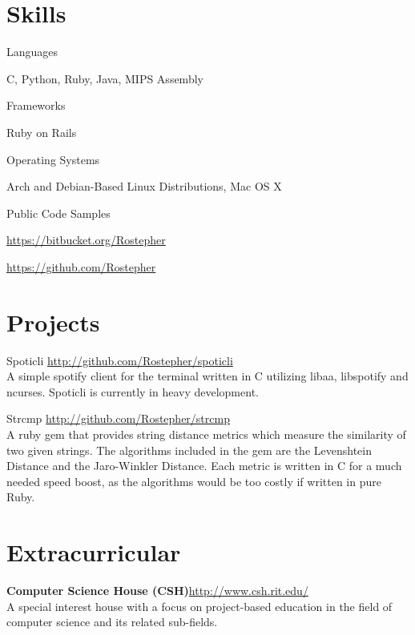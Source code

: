 \documentclass[letterpaper,margin,line,11pt]{resume}
\newcommand{\rurl}[1]{\hfill {\footnotesize \url{#1}}}
\newcommand{\tab}[1]{\hspace{1em}}
\begin{document}
\begin{resume}
\section{\mysidestyle Skills}
	\begin{compactdesc}
		\item[Languages]
			\item\tab{} C, Python, Ruby, Java, MIPS Assembly
			\vspace{1em}
		\item[Frameworks]
			\item\tab{} Ruby on Rails
			\vspace{1em}
		\item[Operating Systems]
			\item\tab{} Arch and Debian-Based Linux Distributions, Mac OS X
			\vspace{1em}
		\item[Public Code Samples]
			\item\tab{} \href{https://bitbucket.org/Rostepher}{https://bitbucket.org/Rostepher}\hfill
			\item\tab{} \href{https://github.com/Rostepher}{https://github.com/Rostepher} \hfill
	\end{compactdesc}

\section{\mysidestyle Projects}
	\begin{compactdesc}
		\item[Spoticli] \rurl{http://github.com/Rostepher/spoticli}
		\\
		A simple spotify client for the terminal written in C utilizing libaa, libspotify and ncurses. Spoticli is currently in heavy development.
		
		\vspace{1em}
		
		\item[Strcmp] \rurl{http://github.com/Rostepher/strcmp}
		\\
		A ruby gem that provides string distance metrics which measure the similarity of two given strings. The algorithms included in the gem are the Levenshtein Distance and the Jaro-Winkler Distance. Each metric is written in C for a much needed speed boost, as the algorithms would be too costly if written in pure Ruby.
	\end{compactdesc}

\section{\mysidestyle Extracurricular}
	\begin{asparablank}
		\item {\bf Computer Science House ({\small CSH})}\rurl{http://www.csh.rit.edu/}
        \\
		A special interest house with a focus on project-based education in the field of computer science and its related sub-fields.
	\end{asparablank}

\end{resume}
\end{document}
